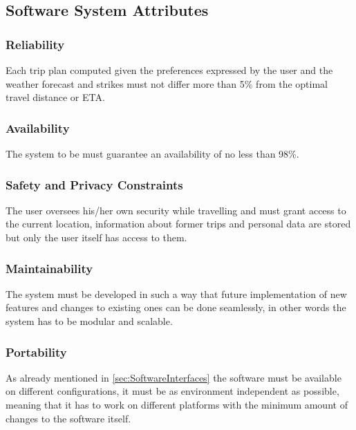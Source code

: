\subsection{Software System Attributes}
\subsubsection{Reliability}
Each trip plan computed given the preferences expressed by the user and the weather forecast and strikes must not differ more than 5\% from the optimal travel distance or ETA.
\subsubsection{Availability}
The system to be must guarantee an availability of no less than 98\%.
\subsubsection{Safety and Privacy Constraints}
The user oversees his/her own security while travelling and must grant access to the current location, information about former trips and personal data are stored but only the user itself has access to them.
\subsubsection{Maintainability}
The system must be developed in such a way that future implementation of new features and changes to existing ones can be done seamlessly, in other words the system has to be modular and scalable.
\subsubsection{Portability}
As already mentioned in \autoref{sec:SoftwareInterfaces} the software must be available on different configurations, it must be as environment independent as possible, meaning that it has to work on different platforms with the minimum amount of changes to the software itself.


